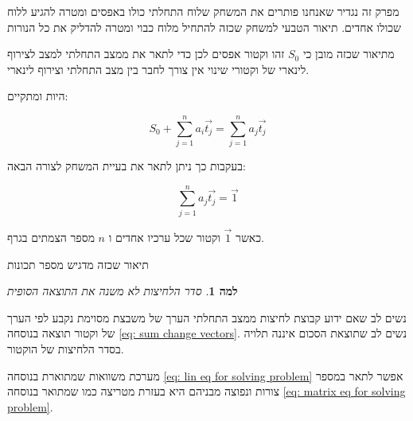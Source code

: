 \documentclass[12pt,twoside]{article}
\newtheorem{lemma}{למה}[section]
\newcommand{\sumi}[1]{\sum_{#1=1}^n}
\begin{document}
מפרק זה נגדיר שאנחנו פותרים את המשחק שלוח התחלתי כולו באפסים
ומטרה להגיע ללוח שכולו אחדים.
תיאור הטבעי למשחק שכזה להתחיל מלוח כבוי ומטרה להדליק את כל הנורות

מתיאור שכזה מובן כי 
$S_0$
זהו וקטור אפסים לכן כדי לתאר את ממצב התחלתי
למצב לצירוף לינארי של וקטורי שינוי 
אין צורך לחבר בין מצב התחלתי וצירוף לינארי.

היות ומתקיים:

\begin{equation}
    \label{eq: sum change vectors}
    S_0 + \sumi{j} a_i \vec{t_j} =  \sumi{j} a_j \vec{t_j}
\end{equation}

בעקבות כך ניתן לתאר את בעיית המשחק לצורה הבאה:

\begin{equation}
    \label{eq: lin eq for solving problem}
    \sumi{j} a_j \vec{t_j} = \vec{1}
\end{equation}

כאשר
$\vec{1}$
וקטור שכל ערכיו אחדים
ו
$n$
מספר הצמתים בגרף.

תיאור שכזה מדגיש מספר תכונות 

\begin{lemma}
    סדר הלחיצות לא משנה את התוצאה הסופית
\end{lemma}
נשים לב שאם ידוע קבוצת לחיצות ממצב התחלתי הערך של משבצת מסוימת נקבע לפי 
הערך של וקטור תוצאה
בנוסחה
\ref{eq: sum change vectors}.
נשים לב שתוצאת הסכום איננה תלויה בסדר הלחיצות של הוקטור. 

מערכת משוואות 
שמתוארת בנוסחה
\ref{eq: lin eq for solving problem}
אפשר לתאר במספר צורות ונפוצה מבניהם היא
בעזרת מטריצה כמו שמתואר 
בנוסחה 
\ref{eq: matrix eq for solving problem}.
\end{document}

